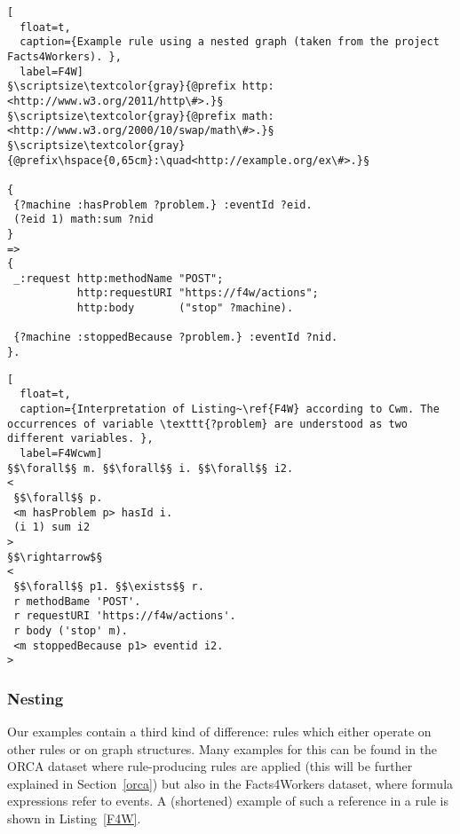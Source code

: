 \begin{lstlisting}[
  float=t,
  caption={Example rule using a nested graph (taken from the project Facts4Workers). },
  label=F4W]
§\scriptsize\textcolor{gray}{@prefix http: <http://www.w3.org/2011/http\#>.}§
§\scriptsize\textcolor{gray}{@prefix math: <http://www.w3.org/2000/10/swap/math\#>.}§
§\scriptsize\textcolor{gray}{@prefix\hspace{0,65cm}:\quad<http://example.org/ex\#>.}§
 
{  
 {?machine :hasProblem ?problem.} :eventId ?eid.
 (?eid 1) math:sum ?nid
}
=>
{
 _:request http:methodName "POST";
           http:requestURI "https://f4w/actions";
           http:body       ("stop" ?machine).
      
 {?machine :stoppedBecause ?problem.} :eventId ?nid.
}. 
\end{lstlisting}
\begin{lstlisting}[
  float=t,
  caption={Interpretation of Listing~\ref{F4W} according to Cwm. The occurrences of variable \texttt{?problem} are understood as two different variables. },
  label=F4Wcwm]
§$\forall$§ m. §$\forall$§ i. §$\forall$§ i2.
<
 §$\forall$§ p.
 <m hasProblem p> hasId i.
 (i 1) sum i2 
> 
§$\rightarrow$§
<
 §$\forall$§ p1. §$\exists$§ r. 
 r methodBame 'POST'. 
 r requestURI 'https://f4w/actions'.
 r body ('stop' m).
 <m stoppedBecause p1> eventid i2. 
>
\end{lstlisting}
\subsubsection{Nesting}\label{nest}

Our examples contain a third kind of difference:
rules which either operate on other rules or on graph structures. Many examples for this can be found in the 
ORCA dataset where rule-producing rules are applied (this will be further explained in Section~\ref{orca}) but also  in the Facts4Workers dataset, where formula expressions 
refer to events.
A (shortened) example of such a reference in a rule is shown in Listing~\ref{F4W}. 

